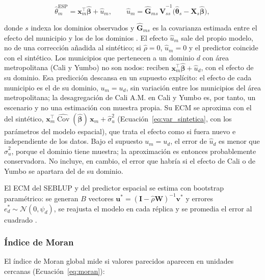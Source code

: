 \begin{equation}
    \hat{\theta}_m^{\text{ESP}} = \mathbf{x}_m^\top\hat{\boldsymbol{\beta}} + \hat{u}_m, \qquad \hat{u}_m = \hat{\mathbf{G}}_{ms}\, \hat{\mathbf{V}}_{ss}^{-1}\big(\hat{\boldsymbol{\theta}}_s - \mathbf{X}_s\hat{\boldsymbol{\beta}}\big),
    \label{eq:pred_espacial}
\end{equation}

donde $s$ indexa los dominios observados y $\hat{\mathbf{G}}_{ms}$ es la covarianza estimada entre el efecto del municipio y los de los dominios \cite[p.~147]{Benedetti2024}. El efecto $\hat{u}_m$ sale del propio modelo, no de una corrección añadida al sintético; si $\hat{\rho} = 0$, $\hat{u}_m = 0$ y el predictor coincide con el sintético. Los municipios que pertenecen a un dominio $d$ con área metropolitana (Cali y Yumbo) no son nodos: reciben $\mathbf{x}_m^\top\hat{\boldsymbol{\beta}} + \hat{u}_d$, con el efecto de su dominio. Esa predicción descansa en un supuesto explícito: el efecto de cada municipio es el de su dominio, $u_m = u_d$, sin variación entre los municipios del área metropolitana; la desagregación de Cali A.M. en Cali y Yumbo es, por tanto, un escenario y no una estimación con muestra propia. Su ECM se aproxima con el del sintético, $\mathbf{x}_m^\top\widehat{\operatorname{Cov}}(\hat{\boldsymbol{\beta}})\,\mathbf{x}_m + \hat{\sigma}_u^2$ (Ecuación~\ref{eq:var_sintetica}, con los parámetros del modelo espacial), que trata el efecto como si fuera nuevo e independiente de los datos. Bajo el supuesto $u_m = u_d$, el error de $\hat{u}_d$ es menor que $\hat{\sigma}_u^2$, porque el dominio tiene muestra; la aproximación es entonces probablemente conservadora. No incluye, en cambio, el error que habría si el efecto de Cali o de Yumbo se apartara del de su dominio.

El ECM del SEBLUP y del predictor espacial se estima con bootstrap paramétrico: se generan $B$ vectores $\mathbf{u}^{*} = (\mathbf{I}-\hat{\rho}\mathbf{W})^{-1}\mathbf{v}^{*}$ y errores $e^{*}_d \sim \mathcal{N}(0, \psi_d)$, se reajusta el modelo en cada réplica y se promedia el error al cuadrado \cite[p.~494]{morales2021smallarea}.

\subsubsection{Índice de Moran}

El índice de Moran global \cite{Moran1950} mide si valores parecidos aparecen en unidades cercanas (Ecuación~\ref{eq:moran}):

